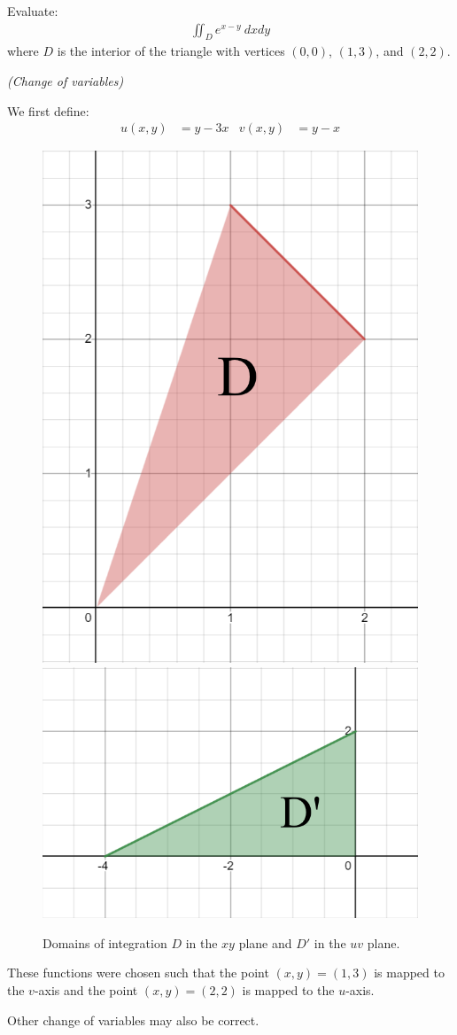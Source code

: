 \begin{tcolorbox}[
        title={Problem 14},
        valign=center,
        nobeforeafter,
        colframe=gray!95!black
    ]
    Evaluate:
    \begin{align}
        \iint_D e^{x - y} \ dxdy
    \end{align}
    where \(D\) is the interior of the triangle with vertices \((0, 0)\), \((1, 3)\), and \((2, 2)\).
\end{tcolorbox}

\begin{solution}
    \textit{(Change of variables)}
    
    We first define:
    \begin{align}
        u(x, y) &= y - 3x & v(x, y) &= y - x
    \end{align}
    
    \begin{figure}[h!]
        \centering
        \includegraphics[height=0.35\textwidth]{Pictures/Tutorial 5-1.png}
        \quad 
        \includegraphics[height=0.35\textwidth]{Pictures/Tutorial 5-2.png}
        \caption{Domains of integration \(D\) in the \(xy\) plane and \(D'\) in the \(uv\) plane.}
    \end{figure}
    
    These functions were chosen such that the point \((x, y) = (1, 3)\) is mapped to the \(v\)-axis and the point \((x, y) = (2, 2)\) is mapped to the \(u\)-axis.
    
    Other change of variables may also be correct.
    

\end{solution}
